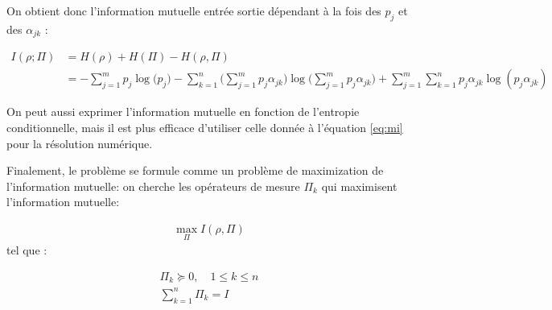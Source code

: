 On obtient donc l'information mutuelle entrée sortie dépendant à la fois des $p_j$ et des $\alpha_{jk}$ :






\begin{align}
    \label{eq:mi}
    I(\rho; \Pi) &= H(\rho) + H(\Pi) - H(\rho, \Pi) \nonumber \\
    &= - \displaystyle \sum_{j=1}^{m} p_j \log \big( p_j \big) - \displaystyle \sum_{k=1}^{n} \big(\displaystyle \sum_{j=1}^{m} p_j\alpha_{jk} \big) \log \big( \displaystyle \sum_{j=1}^{m} p_j\alpha_{jk}\big) + \displaystyle \sum_{j=1}^{m} \displaystyle \sum_{k=1}^{n} p_j\alpha_{jk} \log( p_j\alpha_{jk} )
\end{align}

On peut aussi exprimer l'information mutuelle en fonction de l'entropie conditionnelle, mais il est plus efficace d'utiliser celle donnée à l'équation \ref{eq:mi} pour la résolution numérique.

Finalement, le problème se formule comme un problème de maximization de l'information mutuelle: on cherche les opérateurs de mesure $\Pi_k$ qui maximisent l'information mutuelle:

\begin{align}
    \max\limits_{\Pi} I(\rho, \Pi)
\end{align}
tel que :

\begin{align}
    \Pi_k \succeq 0, \quad 1 \leq k \leq n \label{eq:contrainte_sdp} \\
    \displaystyle \sum_{k=1}^{n} \Pi_k = I \label{eq:contrainte_somme_id}
\end{align}

